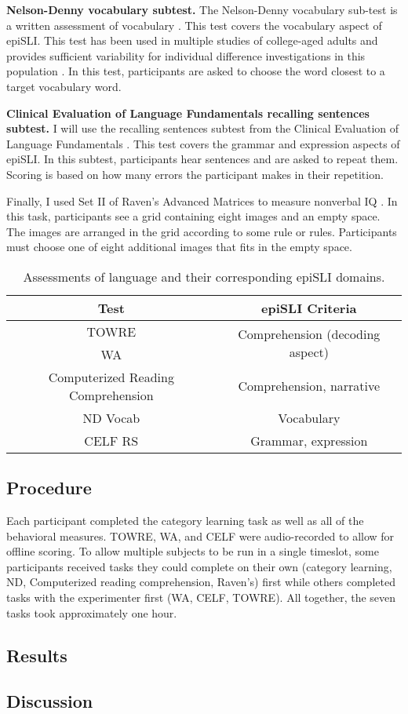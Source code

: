 \documentclass[../dissertation.tex]{subfiles}
\begin{document}
	\textbf{Nelson-Denny vocabulary subtest.} The Nelson-Denny vocabulary sub-test is a written assessment of vocabulary \citep{Brown1981}. This test covers the vocabulary aspect of epiSLI. This test has been used in multiple studies of college-aged adults and provides sufficient variability for individual difference investigations in this population \citetext{e.g., \citealt{Boudewyn2015}; \citealt{Stafura2014}}. In this test, participants are asked to choose the word closest to a target vocabulary word. \par
	\textbf{Clinical Evaluation of Language Fundamentals recalling sentences subtest.} I will use the recalling sentences subtest from the Clinical Evaluation of Language Fundamentals \citetext{CELF; \citealt{BSemel2006}; \citealt{Stafura2014}}. This test covers the grammar and expression aspects of epiSLI. In this subtest, participants hear sentences and are asked to repeat them. Scoring is based on how many errors the participant makes in their repetition.  \par
	Finally, I used Set II of Raven's Advanced Matrices to measure nonverbal IQ \citep{Raven1998}. In this task, participants see a grid containing eight images and an empty space. The images are arranged in the grid according to some rule or rules. Participants must choose one of eight additional images that fits in the empty space.

\begin{table}[H]
\caption{Assessments of language and their corresponding epiSLI domains.}
\vspace{-10pt}
\begin{center}
\begin{tabular}{ c|c } 
 \hline 
 Test & epiSLI Criteria \\ 
 \hline
 TOWRE & \multirow{2}{*}{Comprehension (decoding aspect)}\\ 
 WA & \\ 
 Computerized Reading Comprehension & Comprehension, narrative \\
 ND Vocab & Vocabulary \\ 
 CELF RS & Grammar, expression \\ 
 \hline
\end{tabular}
\end{center}
\label{slitable}
\end{table}


\subsection{Procedure}
	Each participant completed the category learning task as well as all of the behavioral measures. TOWRE, WA, and CELF were audio-recorded to allow for offline scoring. To allow multiple subjects to be run in a single timeslot, some participants received tasks they could complete on their own (category learning, ND, Computerized reading comprehension, Raven's) first while others completed tasks with the experimenter first (WA, CELF, TOWRE). All together, the seven tasks took approximately one hour.
	
\subsection{Results}

\subsection{Discussion}
\end{document}
